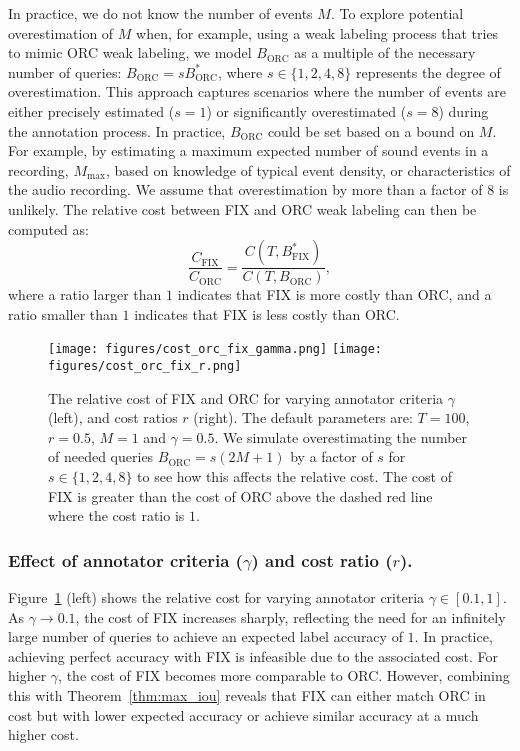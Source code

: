In practice, we do not know the number of events $M$. To explore potential overestimation of $M$ when, for example, using a weak labeling process that tries to mimic ORC weak labeling, we model $B_{\text{ORC}}$ as a multiple of the necessary number of queries: $B_{\text{ORC}} = sB^*_{\text{ORC}}$, where $s \in \{1, 2, 4, 8\}$ represents the degree of overestimation. This approach captures scenarios where the number of events are either precisely estimated ($s=1$) or significantly overestimated ($s=8$) during the annotation process. In practice, $B_{\text{ORC}}$ could be set based on a bound on $M$. For example, by estimating a maximum expected number of sound events in a recording, $M_{\max}$, based on knowledge of typical event density, or characteristics of the audio recording. We assume that overestimation by more than a factor of $8$ is unlikely. The relative cost between FIX and ORC weak labeling can then be computed as:
\begin{equation}
\label{eq:cost_ratio}
    \frac{C_{\text{FIX}}}{C_{\text{ORC}}} = \frac{C(T, B^*_{\text{FIX}})}{C(T, B_{\text{ORC}})},
\end{equation}
where a ratio larger than $1$ indicates that FIX is more costly than ORC, and a ratio smaller than $1$ indicates that FIX is less costly than ORC.



\begin{figure}
    \centering
    \texttt{[image: figures/cost\_orc\_fix\_gamma.png]}
    \texttt{[image: figures/cost\_orc\_fix\_r.png]}
    \caption{The relative cost of FIX and ORC for varying annotator criteria $\gamma$ (left), and cost ratios $r$ (right). The default parameters are: $T=100$, $r=0.5$, $M=1$ and $\gamma=0.5$. We simulate overestimating the number of needed queries $B_{\text{ORC}} = s(2M+1)$ by a factor of $s$ for $s \in \{1, 2, 4, 8\}$ to see how this affects the relative cost. The cost of FIX is greater than the cost of ORC above the dashed red line where the cost ratio is $1$.}
    \label{fig:cost_1}
\end{figure}

\subsubsection{Effect of annotator criteria ($\gamma$) and cost ratio ($r$).} Figure~\ref{fig:cost_1} (left) shows the relative cost for varying annotator criteria $\gamma \in [0.1, 1]$. As $\gamma \rightarrow 0.1$, the cost of FIX increases sharply, reflecting the need for an infinitely large number of queries to achieve an expected label accuracy of $1$. In practice, achieving perfect accuracy with FIX is infeasible due to the associated cost. For higher $\gamma$, the cost of FIX becomes more comparable to ORC. However, combining this with Theorem~\ref{thm:max_iou} reveals that FIX can either match ORC in cost but with lower expected accuracy or achieve similar accuracy at a much higher cost.

